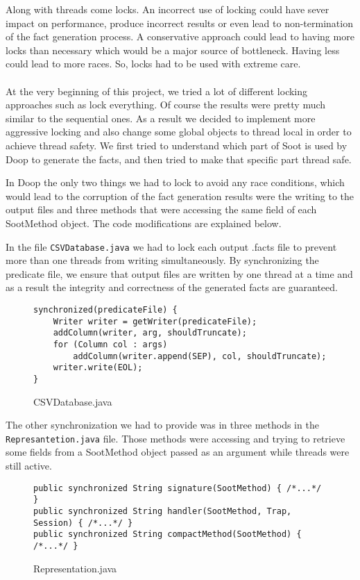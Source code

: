 \documentclass{dithesis}
\begin{document}
	Along with threads come locks. An incorrect use of locking could have sever impact on performance, produce incorrect results or even lead to non-termination of the fact generation process. A conservative approach could lead to having more locks than necessary which would be a major source of bottleneck. Having less could lead to more races. So, locks had to be used with extreme care.
    \\
    \\
	At the very beginning of this project, we tried a lot of different locking approaches such as lock everything. Of course the results were pretty much similar to the sequential ones. As a result we decided to implement more aggressive locking and also change some global objects to thread local in order to achieve thread safety. We first tried to understand which part of Soot is used by Doop to generate the facts, and then tried to make that specific part thread safe.


    	In Doop the only two things we had to lock to avoid any race conditions, which would lead to the corruption of the fact generation results were the writing to the output files and three methods that were accessing the same field of each SootMethod object. The code modifications are explained below.

	    	In the file \texttt{CSVDatabase.java} we had to lock each output .facts file to prevent more than one threads from writing simultaneously. By synchronizing the predicate file, we ensure that output files are written by one thread at a time and as a result the integrity and correctness of the generated facts are guaranteed.
	    	\begin{figure}[H]
\begin{lstlisting}
synchronized(predicateFile) {
    Writer writer = getWriter(predicateFile);
    addColumn(writer, arg, shouldTruncate);
    for (Column col : args)
        addColumn(writer.append(SEP), col, shouldTruncate);
    writer.write(EOL);
}
\end{lstlisting}
	        \caption{CSVDatabase.java}
	        \end{figure}

	    	The other synchronization we had to provide was in three methods in the \texttt{Represantetion.java} file. Those methods were accessing and trying to retrieve some fields from a SootMethod object passed as an argument while threads were still active.
	    	\begin{figure}[H]
\begin{lstlisting}
public synchronized String signature(SootMethod) { /*...*/ }
public synchronized String handler(SootMethod, Trap, Session) { /*...*/ }
public synchronized String compactMethod(SootMethod) { /*...*/ }
\end{lstlisting}
	        \caption{Representation.java}
	        \end{figure}
\end{document}
